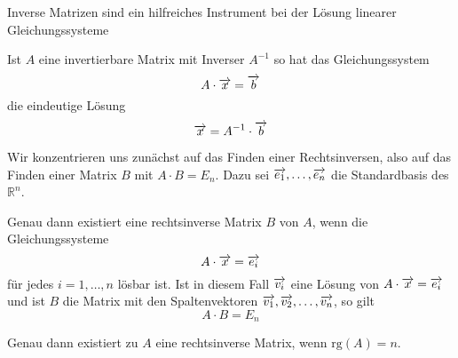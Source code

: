 Inverse Matrizen sind ein hilfreiches Instrument bei der Lösung linearer Gleichungssysteme
 
\begin{notiz} Ist $A$ eine invertierbare Matrix mit Inverser $A^{-1}$ so hat das Gleichungssystem 
  	$$ A \cdot \overrightarrow{x} = \overrightarrow{b} $$
die eindeutige Lösung 
  	$$ \overrightarrow{x} = A^{-1} \cdot \overrightarrow{b} $$
\end{notiz} 


\bigbreak

Wir konzentrieren uns zunächst auf das Finden einer Rechtsinversen, also auf das Finden einer Matrix $B$ 
mit $A \cdot B = E_n$. Dazu sei $\overrightarrow{e_1}, \ldots , \overrightarrow{e_n}$ die Standardbasis 
des $\mathbb R^n$. 

\begin{satz}\label{det_rechtsinverse} Genau dann existiert eine rechtsinverse Matrix $B$ von $A$, wenn die 
Gleichungssysteme 
  	$$ A \cdot \overrightarrow{x} = \overrightarrow{e_i} $$
für jedes $i = 1, \ldots, n$ lösbar ist. Ist in diesem Fall $\overrightarrow{v_i}$ eine Lösung von 
$A \cdot \overrightarrow{x} = \overrightarrow{e_i}$ und ist $B$ die Matrix mit den Spaltenvektoren 
$\overrightarrow{v_1}, \overrightarrow{v_2}, \ldots, \overrightarrow{v_n}$, so gilt
  	$$ A \cdot B = E_n $$
\end{satz}


\begin{korollar} Genau dann existiert zu $A$ eine rechtsinverse Matrix, wenn $\mathrm{rg}(A) = n$.
\end{korollar} 

